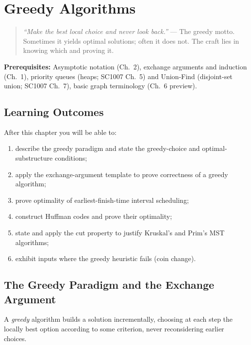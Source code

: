 \chapter{Greedy Algorithms}
\label{ch:greedy}
\begin{quote}
\emph{``Make the best local choice and never look back.''} --- The greedy motto. Sometimes it yields optimal solutions; often it does not. The craft lies in knowing which and proving it.
\end{quote}
\noindent\textbf{Prerequisites:} Asymptotic notation (Ch.~2), exchange arguments and induction (Ch.~1), priority queues (heaps; SC1007 Ch.~5) and Union-Find (disjoint-set union; SC1007 Ch.~7), basic graph terminology (Ch.~6 preview).

\section*{Learning Outcomes}
After this chapter you will be able to:
\begin{enumerate}[label=(L\arabic*)]
    \item describe the greedy paradigm and state the greedy-choice and optimal-substructure conditions;
    \item apply the exchange-argument template to prove correctness of a greedy algorithm;
    \item prove optimality of earliest-finish-time interval scheduling;
    \item construct Huffman codes and prove their optimality;
    \item state and apply the cut property to justify Kruskal's and Prim's MST algorithms;
    \item exhibit inputs where the greedy heuristic fails (coin change).
\end{enumerate}

\section{The Greedy Paradigm and the Exchange Argument}
\label{sec:greedy-paradigm}
A \emph{greedy} algorithm builds a solution incrementally, choosing at each step the locally best option according to some criterion, never reconsidering earlier choices.

